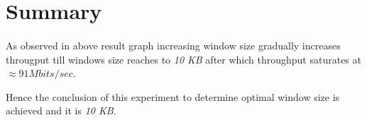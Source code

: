 \documentclass[paper=letter, fontsize=12pt]{article}
\begin{document}
\section{Summary}
\paragraph{} As observed in above result graph increasing window size gradually increases througput till windows size reaches to \textit{10 KB} after which throughput saturates at $\approx91 Mbits/sec$.

Hence the conclusion of this experiment to determine optimal window size is achieved and it is \textit{10 KB}.

\end{document}
